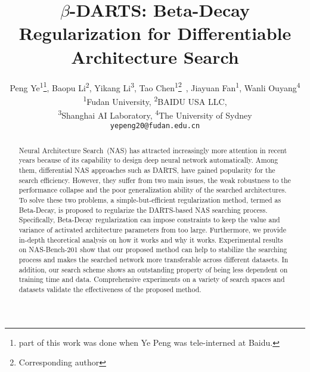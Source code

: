 \documentclass[10pt,twocolumn,letterpaper]{article}
\begin{document}
\title{$\beta$-DARTS: Beta-Decay Regularization for Differentiable Architecture Search}

\author{Peng Ye\textsuperscript{1}\thanks{part of this work was done when Ye Peng was tele-interned at Baidu.}, Baopu Li\textsuperscript{2}, Yikang Li\textsuperscript{3}, Tao Chen\textsuperscript{1}\thanks{ Corresponding author}~, Jiayuan Fan\textsuperscript{1}, Wanli Ouyang\textsuperscript{4}\\
\textsuperscript{1}Fudan University, \textsuperscript{2}BAIDU USA LLC,  \\
\textsuperscript{3}Shanghai AI Laboratory, \textsuperscript{4}The University of Sydney\\
{\tt\small yepeng20@fudan.edu.cn}
}


\maketitle
\begin{abstract}
Neural Architecture Search~(NAS) has attracted increasingly more attention in recent years because of its capability to design deep neural network automatically. 
Among them, differential NAS approaches such as DARTS, have gained popularity for the search efficiency. 
However, they suffer from two main issues, the weak robustness to the performance collapse and the poor generalization ability of the searched architectures. 
To solve these two problems, a simple-but-efficient regularization method, termed as Beta-Decay, is proposed to regularize the DARTS-based NAS searching process. Specifically, Beta-Decay regularization can impose constraints to keep the value and variance of activated architecture parameters from too large.
Furthermore, we provide in-depth theoretical analysis on how it works and why it works. 
Experimental results on NAS-Bench-201 show that our proposed method can help to stabilize the searching process and makes the searched network more transferable across different datasets. 
In addition, our search scheme shows an outstanding property of being less dependent on training time and data.
Comprehensive experiments on a variety of search spaces and datasets validate the effectiveness of the proposed method.
\end{abstract}
\end{document}
